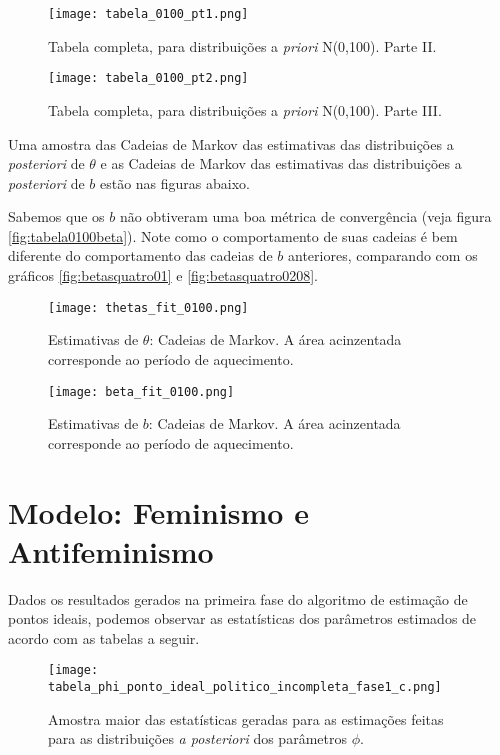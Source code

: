 \documentclass[
	12pt,				%
	openright,			%
	twoside,			%
	a4paper,			%
	english,			%
	brazil				%
	]{abntex2}
\begin{document}
\begin{anexosenv}
 \begin{figure}[!htbp]
    \centering
    \texttt{[image: tabela\_0100\_pt1.png]}
    \caption{Tabela completa, para distribuições a \textit{priori} N(0,100). Parte II.}
    \label{fig:tabelacompleta01002}
 \end{figure}
 
 \begin{figure}[!htbp]
    \centering
    \texttt{[image: tabela\_0100\_pt2.png]}
    \caption{Tabela completa, para distribuições a \textit{priori} N(0,100). Parte III.}
    \label{fig:tabelacompleta01002}
 \end{figure}
 
 Uma amostra das Cadeias de Markov das estimativas das distribuições a \textit{posteriori} de $\theta$ e as Cadeias de Markov das estimativas das distribuições a \textit{posteriori} de $b$ estão nas figuras abaixo.
 
 Sabemos que os $b$ não obtiveram uma boa métrica de convergência (veja figura \ref{fig:tabela0100beta}). Note como o comportamento de suas cadeias é bem diferente do comportamento das cadeias de $b$ anteriores, comparando com os gráficos \ref{fig:betasquatro01} e \ref{fig:betasquatro0208}.
 
 \begin{figure}[!htbp]
    \centering
    \texttt{[image: thetas\_fit\_0100.png]}
    \caption{Estimativas de $\theta$: Cadeias de Markov. A área acinzentada corresponde ao período de aquecimento.}
    \label{fig:thetasquatro0100}
 \end{figure}
 
 \begin{figure}[!htbp]
    \centering
    \texttt{[image: beta\_fit\_0100.png]}
    \caption{Estimativas de $b$: Cadeias de Markov. A área acinzentada corresponde ao período de aquecimento.}
    \label{fig:betasquatro0100}
 \end{figure}
 
 \newpage
 
 \section{Modelo: Feminismo e Antifeminismo}\label{resultadomodeloextra}
 Dados os resultados gerados na primeira fase do algoritmo de estimação de pontos ideais, podemos observar as estatísticas dos parâmetros estimados de acordo com as tabelas a seguir.
 
  \begin{figure}[!htbp]
    \centering
    \texttt{[image: tabela\_phi\_ponto\_ideal\_politico\_incompleta\_fase1\_c.png]}
    \caption{Amostra maior das estatísticas geradas para as estimações feitas para as distribuições \textit{a posteriori} dos parâmetros $\phi$.}
    \label{convphianexo}
 \end{figure}
 

\end{anexosenv}
\end{document}
